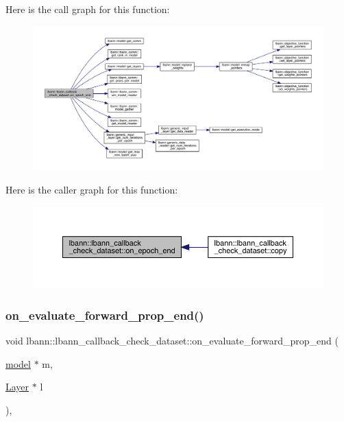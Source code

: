 Here is the call graph for this function\+:\nopagebreak
\begin{figure}[H]
\begin{center}
\leavevmode
\includegraphics[width=350pt]{classlbann_1_1lbann__callback__check__dataset_a8cbc105d8bd9d3b493ef34de7c387929_cgraph}
\end{center}
\end{figure}
Here is the caller graph for this function\+:\nopagebreak
\begin{figure}[H]
\begin{center}
\leavevmode
\includegraphics[width=350pt]{classlbann_1_1lbann__callback__check__dataset_a8cbc105d8bd9d3b493ef34de7c387929_icgraph}
\end{center}
\end{figure}
\mbox{\label{classlbann_1_1lbann__callback__check__dataset_a1223f07081d495d971cdf205f892c50d}} 
\subsubsection{\texorpdfstring{on\+\_\+evaluate\+\_\+forward\+\_\+prop\+\_\+end()}{on\_evaluate\_forward\_prop\_end()}}
{\footnotesize\ttfamily void lbann\+::lbann\+\_\+callback\+\_\+check\+\_\+dataset\+::on\+\_\+evaluate\+\_\+forward\+\_\+prop\+\_\+end (\begin{DoxyParamCaption}\item[{\hyperlink{classlbann_1_1model}{model} $\ast$}]{m,  }\item[{\hyperlink{classlbann_1_1Layer}{Layer} $\ast$}]{l }\end{DoxyParamCaption})\hspace{0.3cm}{\ttfamily [override]}, {\ttfamily [virtual]}}

